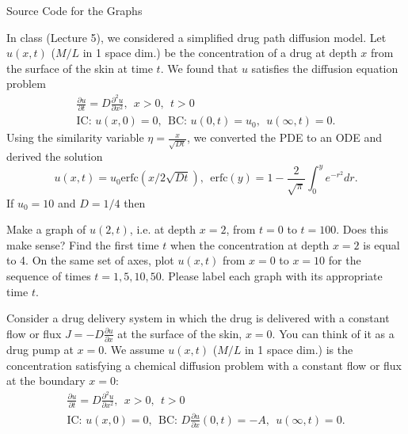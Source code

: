 \documentclass[
	number={3},
	title={}
]{math486homework}
\begin{document}
\maketitle

\begin{listing}[p]
	\caption{Source Code for the Graphs}
	\label{lst:source-code}
\end{listing}

\begin{problems}
	\problem In class (Lecture 5), we considered a simplified drug path diffusion model.
	Let $u(x,t)$ ($M/L$ in 1 space dim.) be the concentration of a drug at depth $x$ from the surface of the skin at time $t$.
	We found that $u$ satisfies the diffusion equation problem
	\begin{equation*}
	\begin{aligned}
		\frac{\partial u}{\partial t} = D\frac{\partial^{2} u}{\partial x^{2}},\ \ x > 0,\ \ t > 0\\
		\mbox{IC: } u(x, 0) = 0,\ \ \mbox{BC: } u(0, t) = u_{0},\ \ u(\infty, t) = 0.
	\end{aligned}
	\end{equation*}
	Using the similarity variable $\eta = \frac{x}{\sqrt{Dt}}$, we converted the PDE to an ODE and derived the solution
	\begin{equation}
		u(x,t) = u_{0}\mbox{erfc}\left( x / 2\sqrt{Dt} \right),\ \ \mbox{erfc}(y) = 1 - \frac{2}{\sqrt{\pi}}\int_{0}^{y} e^{-r^{2}}dr.
		\label{eq:3.1}
	\end{equation}
	If $u_{0} = 10$ and $D = 1/4$ then
	\begin{problems}
		\subproblem Make a graph of $u(2,t)$, i.e. at depth $x=2$, from $t=0$ to $t=100$.
		Does this make sense? 
		\subproblem Find the first time $t$ when the concentration at depth $x=2$ is equal to 4. 
		\subproblem On the same set of axes, plot $u(x,t)$ from $x=0$ to $x=10$ for the sequence of times $t=1, 5, 10, 50$.
		Please label each graph with its appropriate time $t$. 
	\end{problems}
	\problem Consider a drug delivery system in which the drug is delivered with a constant flow or flux $J = -D\frac{\partial u}{\partial x}$ at the surface of the skin, $x=0$.
	You can think of it as a drug pump at $x=0$.
	We assume $u(x,t)$ ($M/L$ in 1 space dim.) is the concentration satisfying a chemical diffusion problem with a constant flow or flux at the boundary $x=0$:
	\begin{equation*}
		\begin{aligned}
			\frac{\partial u}{\partial t} = D\frac{\partial^{2} u}{\partial x^{2}},\ \ x > 0,\ \ t > 0\\
			\mbox{IC: } u(x, 0) = 0,\ \ \mbox{BC: } D\frac{\partial u}{\partial x}(0, t) = -A,\ \ u(\infty, t)=0.
		\end{aligned}
	\end{equation*}


\end{problems}
\end{document}
